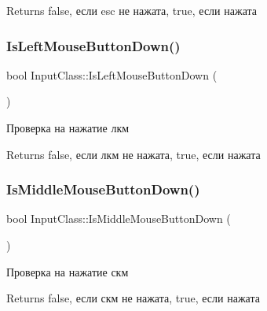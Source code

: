 \begin{DoxyReturn}{Returns}
false, если esc не нажата, true, если нажата 
\end{DoxyReturn}
\mbox{\label{class_input_class_a39a7f997cbdd609f4bfcdd96444c585e}} 
\subsubsection{\texorpdfstring{Is\+Left\+Mouse\+Button\+Down()}{IsLeftMouseButtonDown()}}
{\footnotesize\ttfamily bool Input\+Class\+::\+Is\+Left\+Mouse\+Button\+Down (\begin{DoxyParamCaption}{ }\end{DoxyParamCaption})}



Проверка на нажатие лкм 

\begin{DoxyReturn}{Returns}
false, если лкм не нажата, true, если нажата 
\end{DoxyReturn}
\mbox{\label{class_input_class_a70052a24e82456ba33b38a41851e030b}} 
\subsubsection{\texorpdfstring{Is\+Middle\+Mouse\+Button\+Down()}{IsMiddleMouseButtonDown()}}
{\footnotesize\ttfamily bool Input\+Class\+::\+Is\+Middle\+Mouse\+Button\+Down (\begin{DoxyParamCaption}{ }\end{DoxyParamCaption})}



Проверка на нажатие скм 

\begin{DoxyReturn}{Returns}
false, если скм не нажата, true, если нажата 
\end{DoxyReturn}
\mbox{\label{class_input_class_a60e882f90d3028cde15caa0ee39df7e7}} 
